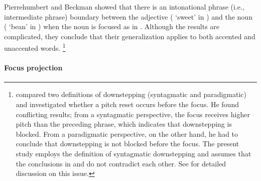 Pierrehumbert and Beckman showed that
there is an intonational phrase (i.e., intermediate phrase) boundary
between the adjective ( `sweet' in \Last[A]) and the noun ( `bean' in \Last[b])
when the noun is focused as in \Last.
Although the results are complicated,
they conclude that their generalization applies to both accented and unaccented words.%
 \footnote{
  compared two definitions of downstepping (syntagmatic and paradigmatic) and investigated whether a pitch reset occurs before the focus.
 He found conflicting results;
 from a syntagmatic perspective, the focus receives higher pitch than the preceding phrase, which indicates that downstepping is blocked.
 From a paradigmatic perspective, on the other hand,
 he had to conclude that downstepping is not blocked before the focus.
 The present study employs the definition of syntagmatic downstepping
 and assumes that the conclusions in  and  do not contradict each other.
 See  for detailed discussion on this issue.
 }



\paragraph{Focus projection}

